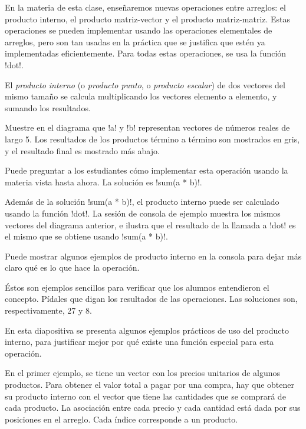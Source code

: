\documentclass[10pt]{article}
\begin{document}
  En la materia de esta clase,
  enseñaremos nuevas operaciones entre arreglos:
  el producto interno, el producto matriz-vector y el producto matriz-matriz.
  Estas operaciones se pueden implementar usando las operaciones elementales de arreglos,
  pero son tan usadas en la práctica
  que se justifica que estén ya implementadas eficientemente.
  Para todas estas operaciones, se usa la función \li!dot!.


  El \emph{producto interno} (o \emph{producto punto}, o \emph{producto escalar})
  de dos vectores del mismo tamaño
  se calcula multiplicando los vectores elemento a elemento,
  y sumando los resultados.

  Muestre en el diagrama
  que \li!a! y \li!b! representan vectores de números reales de largo 5.
  Los resultados de los productos término a término
  son mostrados en gris, y el resultado final es mostrado más abajo.

  Puede preguntar a los estudiantes
  cómo implementar esta operación
  usando la materia vista hasta ahora.
  La solución es \li!sum(a * b)!.


  Además de la solución \li!sum(a * b)!,
  el producto interno puede ser calculado
  usando la función \li!dot!.
  La sesión de consola de ejemplo
  muestra los mismos vectores del diagrama anterior,
  e ilustra que el resultado de la llamada a \li!dot!
  es el mismo que se obtiene usando \li!sum(a * b)!.

  Puede mostrar algunos ejemplos de producto interno
  en la consola para dejar más claro qué es lo que hace la operación.


  Éstos son ejemplos sencillos
  para verificar que los alumnos entendieron el concepto.
  Pídales que digan los resultados de las operaciones.
  Las soluciones son, respectivamente, 27 y 8.


  En esta diapositiva se presenta algunos ejemplos prácticos
  de uso del producto interno,
  para justificar mejor por qué existe una función especial
  para esta operación.

  En el primer ejemplo,
  se tiene un vector con los precios unitarios
  de algunos productos.
  Para obtener el valor total a pagar por una compra,
  hay que obtener su producto interno
  con el vector que tiene las cantidades que se comprará
  de cada producto.
  La asociación entre cada precio y cada cantidad
  está dada por sus posiciones en el arreglo.
  Cada índice corresponde a un producto.
\end{document}
